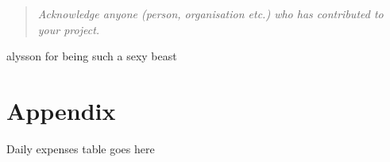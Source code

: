 \documentclass[12pt]{article}
\begin{document}
\begin{quote} \textit{
Acknowledge anyone (person, organisation etc.) who has contributed to your project.
} \end{quote}

alysson for being such a sexy beast



\pagebreak


\section{Appendix}
\label{sec:appen}

Daily expenses table goes here

\pagebreak
 
\end{document}
